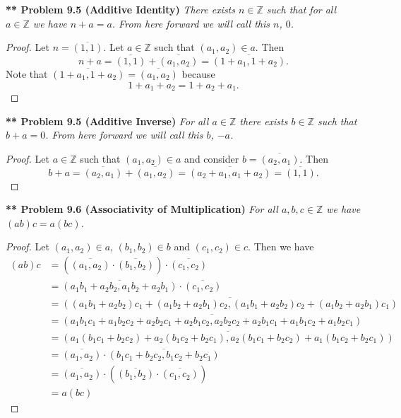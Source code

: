 \documentclass{article}
\begin{document}
\begin{flushleft}
\textbf{** Problem 9.5 (Additive Identity)}
\textit{There exists $n \in \mathbb{Z}$ such that for all $a \in \mathbb{Z}$ we have $n + a = a$. From here forward we will call this $n$, $0$.}
\begin{proof}
Let $n = \overline{(1, 1)}$. Let $a \in \mathbb{Z}$ such that $(a_1, a_2) \in a$. Then
\[
n + a = \overline{(1, 1)} + \overline{(a_1, a_2)} = \overline{(1 + a_1, 1 + a_2)}.
\]
Note that $\overline{(1 + a_1, 1 + a_2)} = \overline{(a_1, a_2)}$ because
\[
1 + a_1 + a_2 = 1 + a_2 + a_1.
\]
\end{proof}

\textbf{** Problem 9.5 (Additive Inverse)}
\textit{For all $a \in \mathbb{Z}$ there exists $b \in \mathbb{Z}$ such that $b + a = 0$. From here forward we will call this $b$, $-a$.}
\begin{proof}
Let $a \in \mathbb{Z}$ such that $(a_1, a_2) \in a$ and consider $b = \overline{(a_2, a_1)}$. Then
\[
b + a = \overline{(a_2, a_1)} + \overline{(a_1, a_2)} = \overline{(a_2 + a_1, a_1 + a_2)} = \overline{(1, 1)}.
\]
\end{proof}

\textbf{** Problem 9.6 (Associativity of Multiplication)}
\textit{For all $a,b,c \in \mathbb{Z}$ we have $(ab)c = a(bc)$.}
\begin{proof}
Let $(a_1,a_2) \in a$, $(b_1,b_2) \in b$ and $(c_1,c_2) \in c$. Then we have
\begin{align*}
(ab)c
&= \left ( \overline{(a_1, a_2)} \cdot \overline{(b_1, b_2)} \right ) \cdot \overline{(c_1, c_2)}\\
&= \overline{(a_1b_1 + a_2b_2, a_1b_2 + a_2b_1)} \cdot \overline{(c_1, c_2)}\\
&= \overline{((a_1b_1 + a_2b_2)c_1 + (a_1b_2 + a_2b_1)c_2, (a_1b_1 + a_2b_2)c_2 + (a_1b_2 + a_2b_1)c_1)}\\
&= \overline{(a_1b_1c_1 + a_1b_2c_2 + a_2b_2c_1 + a_2b_1c_2, a_2b_2c_2 + a_2b_1c_1 + a_1b_1c_2 + a_1b_2c_1)}\\
&= \overline{(a_1(b_1c_1 + b_2c_2) + a_2(b_1c_2 + b_2c_1), a_2(b_1c_1 + b_2c_2) + a_1(b_1c_2 + b_2c_1))}\\
&= \overline{(a_1, a_2)} \cdot \overline{(b_1c_1 + b_2c_2, b_1c_2 + b_2c_1)}\\
&= \overline{(a_1, a_2)} \cdot \left ( \overline{(b_1, b_2)} \cdot \overline{(c_1, c_2)} \right )\\
&= a(bc)
\end{align*}
\end{proof}


\end{flushleft}
\end{document}
